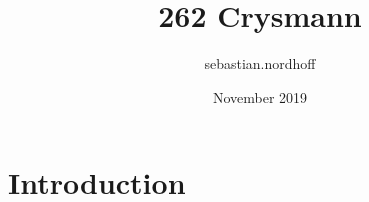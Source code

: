 \documentclass{article}
\title{262 Crysmann}
\author{sebastian.nordhoff }
\date{November 2019}
\begin{document}
\maketitle

\section{Introduction}
\end{document}

